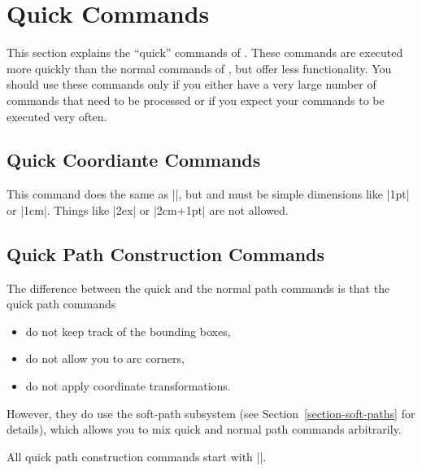 %
%
%


\section{Quick Commands}

This section explains the ``quick'' commands of \pgfname. These
commands are executed more quickly than the normal commands of
\pgfname, but offer less functionality. You should use these commands
only if you either have a very large number of commands that need to
be processed or if you expect your commands to be executed very often.


\subsection{Quick Coordiante Commands}

\begin{command}{\pgfqpoint{}}
  This command does the same as |\pgfpoint|, but  and 
  must be simple dimensions like |1pt| or |1cm|. Things like |2ex| or
  |2cm+1pt| are not allowed.
\end{command}

\subsection{Quick Path Construction Commands}

The difference between the quick and the normal path commands is that
the quick path commands
\begin{itemize}
\item
  do not keep track of the bounding boxes,
\item
  do not allow you to arc corners,
\item
  do not apply coordinate transformations.
\end{itemize}

However, they do use the soft-path subsystem (see
Section~\ref{section-soft-paths} for details), which allows you to mix
quick and normal path commands arbitrarily.

All quick path construction commands start with |\pgfpathq|.

